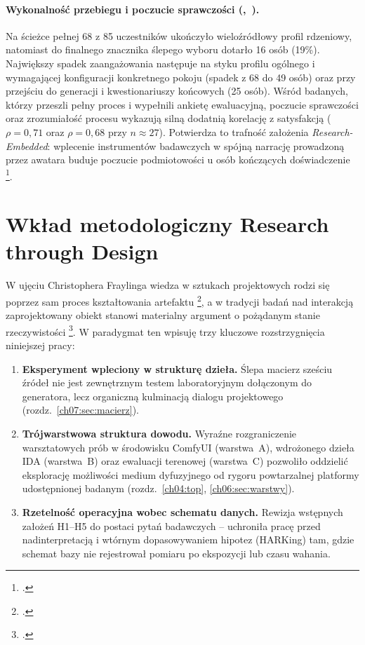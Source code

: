 \paragraph{Wykonalność przebiegu i poczucie sprawczości (,~).}
Na ścieżce pełnej 68 z 85 uczestników ukończyło wieloźródłowy profil rdzeniowy, natomiast do finalnego znacznika ślepego wyboru dotarło 16 osób (19\%). Największy spadek zaangażowania następuje na styku profilu ogólnego i wymagającej konfiguracji konkretnego pokoju (spadek z 68 do 49 osób) oraz przy przejściu do generacji i kwestionariuszy końcowych (25 osób). Wśród badanych, którzy przeszli pełny proces i wypełnili ankietę ewaluacyjną, poczucie sprawczości oraz zrozumiałość procesu wykazują silną dodatnią korelację z satysfakcją ($\rho = 0{,}71$ oraz $\rho = 0{,}68$ przy $n \approx 27$). Potwierdza to trafność założenia \emph{Research-Embedded}: wplecenie instrumentów badawczych w spójną narrację prowadzoną przez awatara buduje poczucie podmiotowości u osób kończących doświadczenie \footcite{zimmerman2007rtd}.

\section{Wkład metodologiczny Research through Design}
\label{ch09:sec:rtd}

W ujęciu Christophera Fraylinga wiedza w sztukach projektowych rodzi się poprzez sam proces kształtowania artefaktu \footcite{frayling1993research}, a w tradycji badań nad interakcją zaprojektowany obiekt stanowi materialny argument o pożądanym stanie rzeczywistości \footcite{zimmerman2007rtd}. W paradygmat ten wpisuję trzy kluczowe rozstrzygnięcia niniejszej pracy:

\begin{enumerate}
  \item \textbf{Eksperyment wpleciony w strukturę dzieła.} Ślepa macierz sześciu źródeł nie jest zewnętrznym testem laboratoryjnym dołączonym do generatora, lecz organiczną kulminacją dialogu projektowego (rozdz.~\ref{ch07:sec:macierz}).
  \item \textbf{Trójwarstwowa struktura dowodu.} Wyraźne rozgraniczenie warsztatowych prób w środowisku ComfyUI (warstwa~A), wdrożonego dzieła IDA (warstwa~B) oraz ewaluacji terenowej (warstwa~C) pozwoliło oddzielić eksplorację możliwości medium dyfuzyjnego od rygoru powtarzalnej platformy udostępnionej badanym (rozdz.~\ref{ch04:top}, \ref{ch06:sec:warstwy}).
  \item \textbf{Rzetelność operacyjna wobec schematu danych.} Rewizja wstępnych założeń H1--H5 do postaci pytań badawczych -- uchroniła pracę przed nadinterpretacją i wtórnym dopasowywaniem hipotez (HARKing) tam, gdzie schemat bazy nie rejestrował pomiaru po ekspozycji lub czasu wahania.
\end{enumerate}

